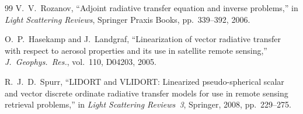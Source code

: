 \documentclass[11pt,a4paper]{article}
\theoremstyle{definition}
\begin{document}
\begin{thebibliography}{99}
  V.~V.~Rozanov,
  ``Adjoint radiative transfer equation and inverse problems,''
  in \emph{Light Scattering Reviews}, Springer Praxis Books,
  pp.~339--392, 2006.

  O.~P.~Hasekamp and J.~Landgraf,
  ``Linearization of vector radiative transfer with respect to aerosol
  properties and its use in satellite remote sensing,''
  \emph{J.\ Geophys.\ Res.}, vol.~110, D04203, 2005.

  R.~J.~D.~Spurr,
  ``LIDORT and VLIDORT: Linearized pseudo-spherical scalar and vector
  discrete ordinate radiative transfer models for use in remote sensing
  retrieval problems,''
  in \emph{Light Scattering Reviews~3}, Springer, 2008, pp.~229--275.

\end{thebibliography}
\end{document}
